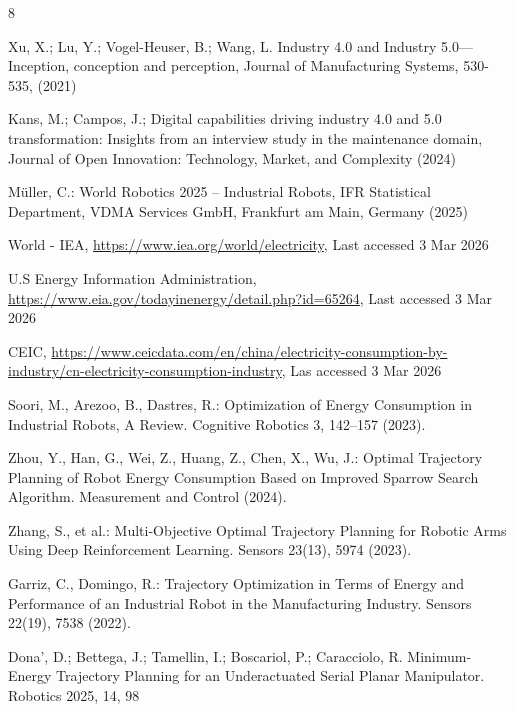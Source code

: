 \documentclass[runningheads]{llncs}
\begin{document}
%
%
%
% 
% 
%
\begin{thebibliography}{8}

Xu, X.; Lu, Y.; Vogel-Heuser, B.; Wang, L. Industry 4.0 and Industry 5.0—Inception, conception and perception, Journal of Manufacturing Systems, 530-535, (2021)

Kans, M.; Campos, J.; Digital capabilities driving industry 4.0 and 5.0 transformation: Insights from an interview study in the maintenance domain, Journal of Open Innovation: Technology, Market, and Complexity (2024)

Müller, C.: World Robotics 2025 – Industrial Robots, IFR Statistical
Department, VDMA Services GmbH, Frankfurt am Main, Germany (2025)

World - IEA, \url{https://www.iea.org/world/electricity}, Last accessed 3 Mar 2026

U.S Energy Information Administration, \url{https://www.eia.gov/todayinenergy/detail.php?id=65264}, Last accessed 3 Mar 2026

CEIC, \url{https://www.ceicdata.com/en/china/electricity-consumption-by-industry/cn-electricity-consumption-industry}, Las accessed 3 Mar 2026

Soori, M., Arezoo, B., Dastres, R.: Optimization of Energy 
Consumption in Industrial Robots, A Review. Cognitive Robotics 3, 142--157 (2023).

Zhou, Y., Han, G., Wei, Z., Huang, Z., Chen, X., Wu, J.: Optimal Trajectory Planning of Robot Energy Consumption Based on Improved Sparrow Search Algorithm. Measurement and Control (2024).

Zhang, S., et al.: Multi-Objective Optimal Trajectory Planning for Robotic Arms Using Deep Reinforcement Learning. Sensors 23(13), 5974 (2023).

Garriz, C., Domingo, R.: Trajectory Optimization in Terms of Energy and Performance of an Industrial Robot in the Manufacturing Industry. Sensors 22(19), 7538 (2022). 

Dona’, D.; Bettega, J.; Tamellin, I.; Boscariol, P.; Caracciolo, R. Minimum-Energy Trajectory Planning for an Underactuated Serial Planar Manipulator. Robotics 2025, 14, 98


\end{thebibliography}
\end{document}
